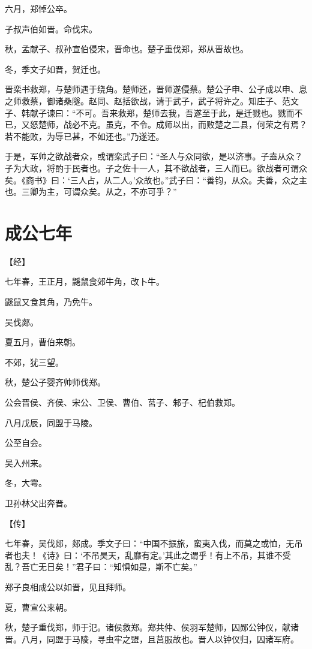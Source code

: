\documentclass[a4paper,12pt,UTF8,twoside]{ctexbook}
\begin{document}
六月，郑悼公卒。

子叔声伯如晋。命伐宋。



秋，孟献子、叔孙宣伯侵宋，晋命也。楚子重伐郑，郑从晋故也。

冬，季文子如晋，贺迁也。

晋栾书救郑，与楚师遇于绕角。楚师还，晋师遂侵蔡。楚公子申、公子成以申、息之师救蔡，御诸桑隧。赵同、赵括欲战，请于武子，武子将许之。知庄子、范文子、韩献子谏曰：“不可。吾来救郑，楚师去我，吾遂至于此，是迁戮也。戮而不已，又怒楚师，战必不克。虽克，不令。成师以出，而败楚之二县，何荣之有焉？若不能败，为辱已甚，不如还也。”乃遂还。

于是，军帅之欲战者众，或谓栾武子曰：“圣人与众同欲，是以济事。子盍从众？子为大政，将酌于民者也。子之佐十一人，其不欲战者，三人而已。欲战者可谓众矣。《商书》曰：‘三人占，从二人。’众故也。”武子曰：“善钧，从众。夫善，众之主也。三卿为主，可谓众矣。从之，不亦可乎？”


\chapter{成公七年}



【经】

七年春，王正月，鼷鼠食郊牛角，改卜牛。

鼷鼠又食其角，乃免牛。

吴伐郯。

夏五月，曹伯来朝。

不郊，犹三望。

秋，楚公子婴齐帅师伐郑。

公会晋侯、齐侯、宋公、卫侯、曹伯、莒子、邾子、杞伯救郑。

八月戊辰，同盟于马陵。

公至自会。

吴入州来。

冬，大雩。

卫孙林父出奔晋。

【传】

七年春，吴伐郯，郯成。季文子曰：“中国不振旅，蛮夷入伐，而莫之或恤，无吊者也夫！《诗》曰：‘不吊昊天，乱靡有定。’其此之谓乎！有上不吊，其谁不受乱？吾亡无日矣！”君子曰：“知惧如是，斯不亡矣。”

郑子良相成公以如晋，见且拜师。

夏，曹宣公来朝。

秋，楚子重伐郑，师于氾。诸侯救郑。郑共仲、侯羽军楚师，囚郧公钟仪，献诸晋。八月，同盟于马陵，寻虫牢之盟，且莒服故也。晋人以钟仪归，囚诸军府。
\end{document}

